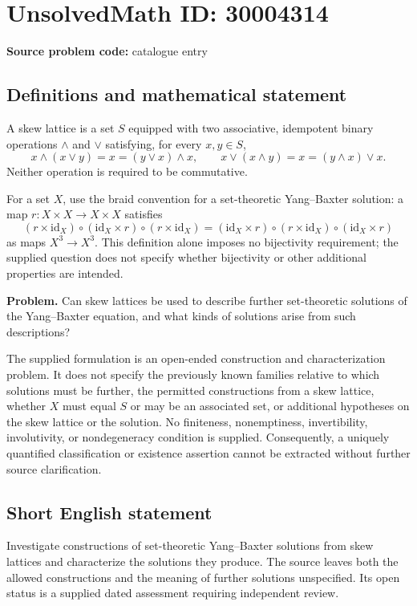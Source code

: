\documentclass[11pt]{article}
\begin{document}
\section*{UnsolvedMath ID: 30004314}
\textbf{Source problem code:} catalogue entry
\subsection{Definitions and mathematical statement}
A skew lattice is a set \(S\) equipped with two associative, idempotent binary operations \(\wedge\) and \(\vee\) satisfying, for every \(x,y\in S\),
\[
x\wedge(x\vee y)=x=(y\vee x)\wedge x,
\qquad
x\vee(x\wedge y)=x=(y\wedge x)\vee x.
\]
Neither operation is required to be commutative.

For a set \(X\), use the braid convention for a set-theoretic Yang--Baxter solution: a map \(r\colon X\times X\to X\times X\) satisfies
\[
(r\times\mathrm{id}_X)\circ(\mathrm{id}_X\times r)\circ(r\times\mathrm{id}_X)
=
(\mathrm{id}_X\times r)\circ(r\times\mathrm{id}_X)\circ(\mathrm{id}_X\times r)
\]
as maps \(X^3\to X^3\). This definition alone imposes no bijectivity requirement; the supplied question does not specify whether bijectivity or other additional properties are intended.

\textbf{Problem.} Can skew lattices be used to describe further set-theoretic solutions of the Yang--Baxter equation, and what kinds of solutions arise from such descriptions?

The supplied formulation is an open-ended construction and characterization problem. It does not specify the previously known families relative to which solutions must be further, the permitted constructions from a skew lattice, whether \(X\) must equal \(S\) or may be an associated set, or additional hypotheses on the skew lattice or the solution. No finiteness, nonemptiness, invertibility, involutivity, or nondegeneracy condition is supplied. Consequently, a uniquely quantified classification or existence assertion cannot be extracted without further source clarification.
\subsection{Short English statement}
Investigate constructions of set-theoretic Yang--Baxter solutions from skew lattices and characterize the solutions they produce. The source leaves both the allowed constructions and the meaning of further solutions unspecified. Its open status is a supplied dated assessment requiring independent review.
\end{document}
